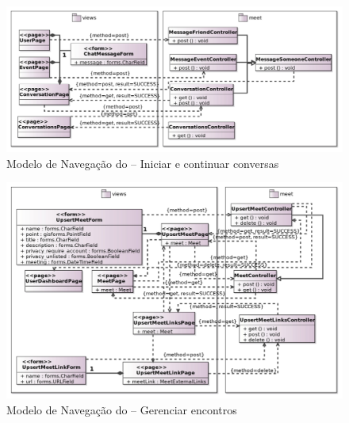 \begin{figure}[H]
	\centering
	\includegraphics[scale=0.15]{figuras/FrameWebNavigationModel3.jpg}
	\caption{Modelo de Navegação do \imprimirtitulo{} -- Iniciar e continuar conversas}
	\label{fig:nav3}
\end{figure}

\begin{figure}[H]
	\centering
	\includegraphics[scale=0.15]{figuras/FrameWebNavigationModel4.jpg}
	\caption{Modelo de Navegação do \imprimirtitulo{} -- Gerenciar encontros}
	\label{fig:nav4}
\end{figure}


